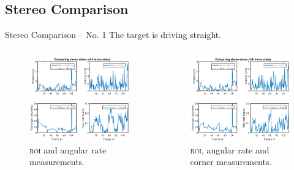 \documentclass{beamer}
\newcommand{\roi}{\textsc{roi}\xspace}
\begin{document}
\subsection{Stereo Comparison}

\begin{frame}{Stereo Comparison -- No. 1}
	The target is driving straight.
	\begin{columns}[T]
	\begin{figure}
		\includegraphics[width=\textwidth]{Stereo/155532_RoiAngVel_gate_klt}
		\caption{\roi and angular rate measurements.}
	\end{figure}
	\begin{figure}
		\includegraphics[width=\textwidth]{Stereo/155532_AllMeasurements_gate_klt}
		\caption{\roi, angular rate and corner measurements.}
	\end{figure}
	\end{columns}


\end{frame}
\end{document}
